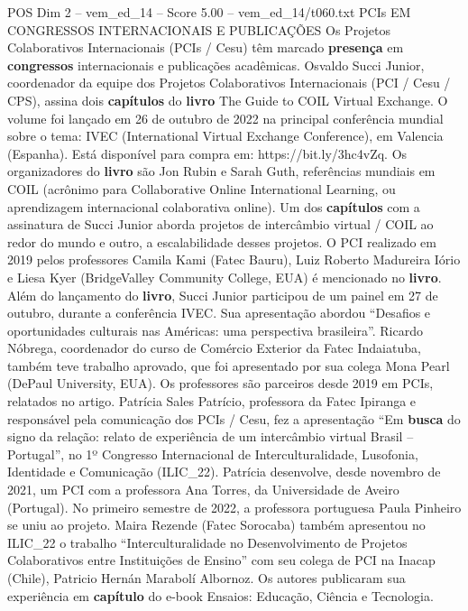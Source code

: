 \begin{textsample}{POS Dim 2 – vem\_ed\_14 – Score 5.00 – vem\_ed\_14/t060.txt}  \label{ex:f2_pos_118}
PCIs EM CONGRESSOS INTERNACIONAIS E PUBLICAÇÕES Os Projetos Colaborativos Internacionais (PCIs / Cesu) têm marcado \textbf{presença} em \textbf{congressos} internacionais e publicações acadêmicas.
Osvaldo Succi Junior, coordenador da equipe dos Projetos Colaborativos Internacionais (PCI / Cesu / CPS), assina dois \textbf{capítulos} do \textbf{livro} The Guide to COIL Virtual Exchange.
O volume foi lançado em 26 de outubro de 2022 na principal conferência mundial sobre o tema: IVEC (International Virtual Exchange Conference), em Valencia (Espanha).
Está disponível para compra em: https://bit.ly/3hc4vZq.
Os organizadores do \textbf{livro} são Jon Rubin e Sarah Guth, referências mundiais em COIL (acrônimo para Collaborative Online International Learning, ou aprendizagem internacional colaborativa online).
Um dos \textbf{capítulos} com a assinatura de Succi Junior aborda projetos de intercâmbio virtual / COIL ao redor do mundo e outro, a escalabilidade desses projetos.
O PCI realizado em 2019 pelos professores Camila Kami (Fatec Bauru), Luiz Roberto Madureira Iório e Liesa Kyer (BridgeValley Community College, EUA) é mencionado no \textbf{livro}.
Além do lançamento do \textbf{livro}, Succi Junior participou de um painel em 27 de outubro, durante a conferência IVEC.
Sua apresentação abordou “Desafios e oportunidades culturais nas Américas: uma perspectiva brasileira”.
Ricardo Nóbrega, coordenador do curso de Comércio Exterior da Fatec Indaiatuba, também teve trabalho aprovado, que foi apresentado por sua colega Mona Pearl (DePaul University, EUA).
Os professores são parceiros desde 2019 em PCIs, relatados no artigo.
Patrícia Sales Patrício, professora da Fatec Ipiranga e responsável pela comunicação dos PCIs / Cesu, fez a apresentação “Em \textbf{busca} do signo da relação: relato de experiência de um intercâmbio virtual Brasil – Portugal”, no 1º Congresso Internacional de Interculturalidade, Lusofonia, Identidade e Comunicação (ILIC\_22).
Patrícia desenvolve, desde novembro de 2021, um PCI com a professora Ana Torres, da Universidade de Aveiro (Portugal).
No primeiro semestre de 2022, a professora portuguesa Paula Pinheiro se uniu ao projeto.
Maira Rezende (Fatec Sorocaba) também apresentou no ILIC\_22 o trabalho “Interculturalidade no Desenvolvimento de Projetos Colaborativos entre Instituições de Ensino” com seu colega de PCI na Inacap (Chile), Patricio Hernán Marabolí Albornoz.
Os autores publicaram sua experiência em \textbf{capítulo} do e-book Ensaios: Educação, Ciência e Tecnologia.

\end{textsample}

